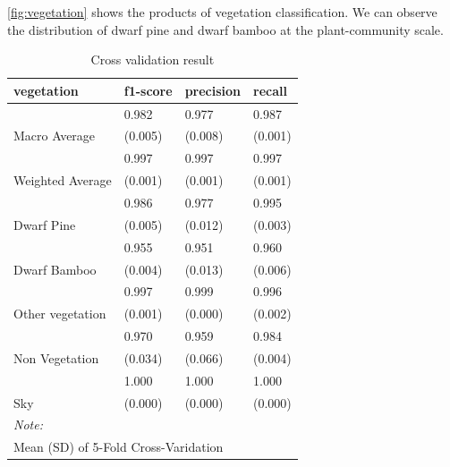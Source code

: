 \documentclass{article}
\begin{document}
\ref{fig:vegetation} shows the products of vegetation classification. We can observe the distribution of dwarf pine and dwarf bamboo at the plant-community scale.

\begin{table}

\caption{\label{tab:unnamed-chunk-1}Cross validation result \label{tab:vegetation_cv}}
\centering
\begin{tabular}[t]{llll}
\toprule
vegetation & f1-score & precision & recall\\
\midrule
 & 0.982 & 0.977 & 0.987\\
\cmidrule{2-4}
\multirow{-2}{*}{\raggedright\arraybackslash Macro Average} & (0.005) & (0.008) & (0.001)\\
\cmidrule{1-4}
 & 0.997 & 0.997 & 0.997\\
\cmidrule{2-4}
\multirow{-2}{*}{\raggedright\arraybackslash Weighted Average} & (0.001) & (0.001) & (0.001)\\
\cmidrule{1-4}
 & 0.986 & 0.977 & 0.995\\
\cmidrule{2-4}
\multirow{-2}{*}{\raggedright\arraybackslash Dwarf Pine} & (0.005) & (0.012) & (0.003)\\
\cmidrule{1-4}
 & 0.955 & 0.951 & 0.960\\
\cmidrule{2-4}
\multirow{-2}{*}{\raggedright\arraybackslash Dwarf Bamboo} & (0.004) & (0.013) & (0.006)\\
\cmidrule{1-4}
 & 0.997 & 0.999 & 0.996\\
\cmidrule{2-4}
\multirow{-2}{*}{\raggedright\arraybackslash Other vegetation} & (0.001) & (0.000) & (0.002)\\
\cmidrule{1-4}
 & 0.970 & 0.959 & 0.984\\
\cmidrule{2-4}
\multirow{-2}{*}{\raggedright\arraybackslash Non Vegetation} & (0.034) & (0.066) & (0.004)\\
\cmidrule{1-4}
 & 1.000 & 1.000 & 1.000\\
\cmidrule{2-4}
\multirow{-2}{*}{\raggedright\arraybackslash Sky} & (0.000) & (0.000) & (0.000)\\
\bottomrule
\multicolumn{4}{l}{\rule{0pt}{1em}\textit{Note: }}\\
\multicolumn{4}{l}{\rule{0pt}{1em}Mean (SD) of 5-Fold Cross-Varidation}\\
\end{tabular}
\end{table}
\end{document}

